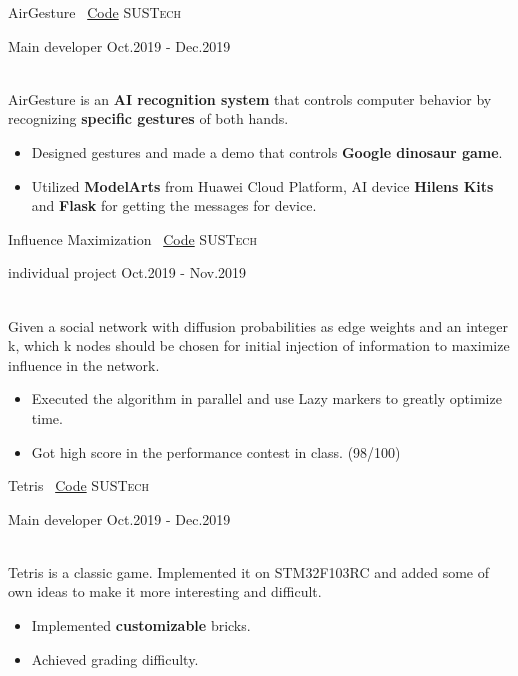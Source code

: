 \documentclass[10pt,a4paper]{article}
\begin{document}
\headedsection
  {AirGesture \faGithub~\href{https://github.com/Eveneko/AirGesture}{Code}}
  {\textsc{SUSTech}} {%
  \headedsubsection
    {Main developer}
    {Oct.2019 - Dec.2019}
    {
      \\
      AirGesture is an \textbf{AI recognition system} that controls computer behavior by \\
      recognizing \textbf{specific gestures} of both hands.
      \begin{itemize}
        \item Designed gestures and made a demo that controls \textbf{Google dinosaur game}.
        \item Utilized \textbf{ModelArts} from Huawei Cloud Platform, AI device \textbf{Hilens Kits} \\
        and \textbf{Flask} for getting the messages for device.
      \end{itemize}
    }
}

\headedsection
  {Influence Maximization \faGithub~\href{https://github.com/Eveneko/SUSTech-Courses/tree/master/CS303-Artifical-Intelligence/IMP}{Code}}
  {\textsc{SUSTech}} {%
  \headedsubsection
    {individual project}
    {Oct.2019 - Nov.2019}
    {
      \\
      Given a social network with diffusion probabilities as edge weights and an integer \\
      k, which k nodes should be chosen for initial injection of information to maximize \\
      influence in the network.
      \begin{itemize}
        \item Executed the algorithm in parallel and use Lazy markers to greatly optimize time.
        \item Got high score in the performance contest in class. (98/100)
      \end{itemize}
    }
}

\headedsection
  {Tetris \faGithub~\href{https://github.com/Eveneko/Tetris}{Code}}
  {\textsc{SUSTech}} {%
  \headedsubsection
    {Main developer}
    {Oct.2019 - Dec.2019}
    {
      \\
      Tetris is a classic game. Implemented it on STM32F103RC and added some of \\
      own ideas to make it more interesting and difficult.
      \begin{itemize}
        \item Implemented \textbf{customizable} bricks.
        \item Achieved grading difficulty.
      \end{itemize}
    }
}
\end{document}
